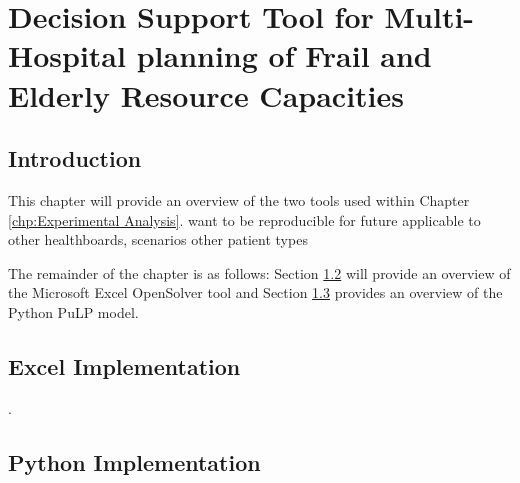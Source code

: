 \documentclass[../thesis.tex]{subfiles}
\begin{document}
\chapter{Decision Support Tool for Multi-Hospital planning of Frail and Elderly Resource Capacities}

\section{Introduction}
This chapter will provide an overview of the two tools used within Chapter \ref{chp:Experimental Analysis}.
want to be reproducible for future
applicable to other healthboards, scenarios
other patient types

The remainder of the chapter is as follows: Section \ref{sec:excelimp} will provide an overview of the Microsoft Excel OpenSolver tool and Section \ref{sec:pythonimpl} provides an overview of the Python PuLP model.


\section{Excel Implementation}\label{sec:excelimp}.




\section{Python Implementation}\label{sec:pythonimpl}
\end{document}
